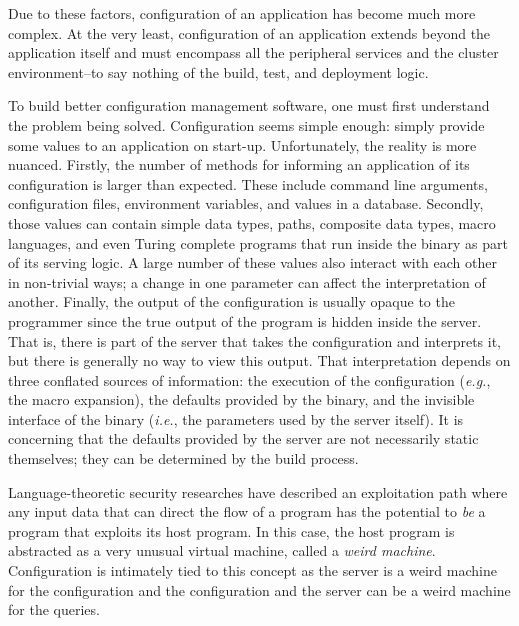 \documentclass[letterpaper,twocolumn,10pt]{article}
\begin{document}
Due to these factors, configuration of an application has become much more complex. At the very least, configuration of an application extends beyond the application itself and must encompass all the peripheral services and the cluster environment--to say nothing of the build, test, and deployment logic.

To build better configuration management software, one must first understand the problem being solved. Configuration seems simple enough: simply provide some values to an application on start-up. Unfortunately, the reality is more nuanced. Firstly, the number of methods for informing an application of its configuration is larger than expected. These include command line arguments, configuration files, environment variables, and values in a database. Secondly, those values can contain simple data types, paths, composite data types, macro languages, and even Turing complete programs that run inside the binary as part of its serving logic. A large number of these values also interact with each other in non-trivial ways; a change in one parameter can affect the interpretation of another. Finally, the output of the configuration is usually opaque to the programmer since the true output of the program is hidden inside the server. That is, there is part of the server that takes the configuration and interprets it, but there is generally no way to view this output. That interpretation depends on three conflated sources of information: the execution of the configuration (\emph{e.g.}, the macro expansion), the defaults provided by the binary, and the invisible interface of the binary (\emph{i.e.}, the parameters used by the server itself). It is concerning that the defaults provided by the server are not necessarily static themselves; they can be determined by the build process.

Language-theoretic security researches have described an exploitation path where any input data that can direct the flow of a program has the potential to \emph{be} a program that exploits its host program. In this case, the host program is abstracted as a very unusual virtual machine, called a \emph{weird machine}.\cite{cats,weird} Configuration is intimately tied to this concept as the server is a weird machine for the configuration and the configuration and the server can be a weird machine for the queries.
\end{document}
